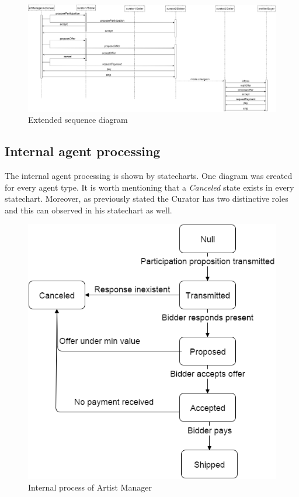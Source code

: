 \documentclass[a4paper,11pt]{report}
\begin{document}
     \begin{figure}[ht!]
    \centering
    \includegraphics[width=\textwidth]{media/extended_seq_diag.png}
    \caption{Extended sequence diagram}
    \label{figure:extSeqDiag}
   \end{figure}
  
  \subsection{Internal agent processing}
  The internal agent processing is shown by statecharts. One diagram was created for every
  agent type. It is worth mentioning that a \textit{Canceled} state exists in every
  statechart. Moreover, as previously stated the Curator has two distinctive roles
  and this can observed in his statechart as well.
  
   \begin{figure}[ht!]
    \centering
    \includegraphics[width=\textwidth]{media/statechart_artistM.png}
    \caption{Internal process of Artist Manager}
    \label{figure:statechartArtistM}
   \end{figure}
   
\end{document}
